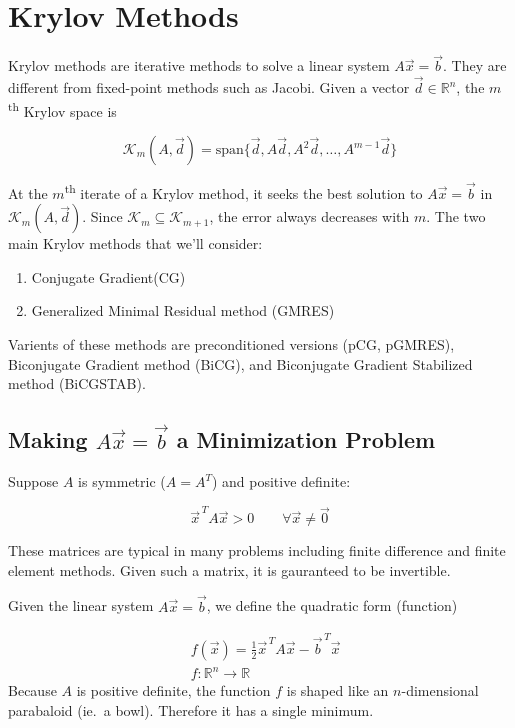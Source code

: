 
\section{Krylov Methods}

Krylov methods are iterative methods to solve a linear system $A\vec{x}=\vec{b}$. They are different from fixed-point methods such as Jacobi. Given a vector $\vec{d}\in \mathbb{R}^n$, the $m$\textsuperscript{th} Krylov space is

\begin{equation*}
    \mathcal{K}_m (A, \vec{d}) = \text{span}\{ \vec{d}, A\vec{d}, A^2 \vec{d}, \ldots, A^{m-1}\vec{d}\}
\end{equation*}

At the $m$\textsuperscript{th} iterate of a Krylov method, it seeks the best solution to $A\vec{x}=\vec{b}$ in $\mathcal{K}_m(A, \vec{d})$. Since $\mathcal{K}_m \subseteq \mathcal{K}_{m+1}$, the error always decreases with $m$. The two main Krylov methods that we'll consider:

\begin{enumerate}[1)]
    \item Conjugate Gradient(CG)
    \item Generalized Minimal Residual method (GMRES)
\end{enumerate}

Varients of these methods are preconditioned versions (pCG, pGMRES), Biconjugate Gradient method (BiCG), and Biconjugate Gradient Stabilized method (BiCGSTAB).

\subsection*{Making $A\vec{x}=\vec{b}$ a Minimization Problem}

Suppose $A$ is symmetric ($A=A^T$) and positive definite:

\begin{equation*}
    \vec{x}^{\,T}A\vec{x} > 0 \qquad \forall \vec{x}\neq\vec{0}
\end{equation*}

These matrices are typical in many problems including finite difference and finite element methods. Given such a matrix, it is gauranteed to be invertible.

Given the linear system $A\vec{x} = \vec{b}$, we define the quadratic form (function)

\begin{align*}
    &f(\vec{x}) = \frac{1}{2}\vec{x}^{\,T}A\vec{x} - \vec{b}^{\,T}\vec{x} \\
    &f: \mathbb{R}^n \rightarrow \mathbb{R}
\end{align*}
Because $A$ is positive definite, the function $f$ is shaped like an $n$-dimensional parabaloid (ie.\ a bowl). Therefore it has a single minimum.

